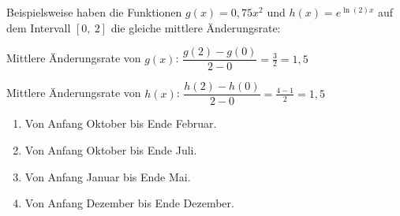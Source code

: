 Beispielsweise haben die Funktionen \(g(x)=0,75x^2\) und \(h(x)=e^{\ln(2)x}\) auf dem Intervall \([0,\ 2]\) die gleiche mittlere Änderungsrate:

Mittlere Änderungsrate von \(g(x)\): \(\dfrac{g(2)-g(0)}{2-0}=\frac{3}{2}=1,5\)

Mittlere Änderungsrate von \(h(x)\): \(\dfrac{h(2)-h(0)}{2-0}=\frac{4-1}{2}=1,5\)
\newpage
\begin{Exercise}[title={Bestimme die durchschnittliche Änderungsrate des DAX für folgende Zeiträume jeweils pro Monat.}, label=aenderungsrateA1]

    \begin{minipage}{\textwidth}
		\begin{enumerate}[label=\alph*)]
			\item Von Anfang Oktober bis Ende Februar.
			\item Von Anfang Oktober bis Ende Juli.
			\item Von Anfang Januar bis Ende Mai.
			\item Von Anfang Dezember bis Ende Dezember.
		\end{enumerate}%
    \end{minipage}%
\end{Exercise}

